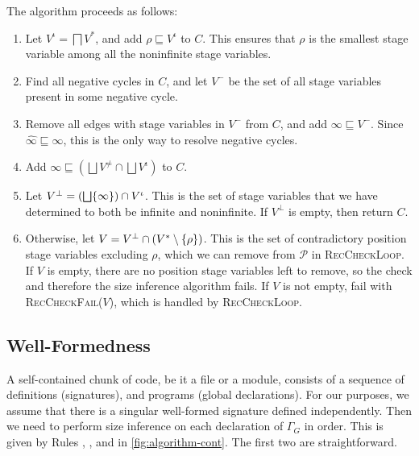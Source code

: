 \documentclass[acmsmall,screen,review,10pt]{acmart} %
\begin{document}
The algorithm proceeds as follows:

\begin{enumerate}
    \item Let $V^\iota = \bigsqcap V^*$, and add $\rho \sqsubseteq V^\iota$ to $C$. This ensures that $\rho$ is the smallest stage variable among all the noninfinite stage variables.
    \item Find all negative cycles in $C$, and let $V^-$ be the set of all stage variables present in some negative cycle.
    \item Remove all edges with stage variables in $V^-$ from $C$, and add $\infty \sqsubseteq V^-$. Since $\widehat{\infty} \sqsubseteq \infty$, this is the only way to resolve negative cycles.
    \item Add $\infty \sqsubseteq \left(\bigsqcup V^\neq \cap \bigsqcup V^\iota\right)$ to $C$.
    \item Let $V^\bot = \left(\bigsqcup \{\infty\}\right) \cap V^\iota$. This is the set of stage variables that we have determined to both be infinite and noninfinite. If $V^\bot$ is empty, then return $C$.
    \item Otherwise, let $V = V^\bot \cap (V^* \setminus \{\rho\})$. This is the set of contradictory position stage variables excluding $\rho$, which we can remove from $\mathcal{P}$ in \textsc{RecCheckLoop}. If $V$ is empty, there are no position stage variables left to remove, so the check and therefore the size inference algorithm fails. If $V$ is not empty, fail with \textsc{RecCheckFail}($V$), which is handled by \textsc{RecCheckLoop}.
\end{enumerate}



\subsection{Well-Formedness}

A self-contained chunk of code, be it a file or a module, consists of a sequence of \coinductive definitions (signatures), and programs (global declarations). For our purposes, we assume that there is a singular well-formed signature defined independently. Then we need to perform size inference on each declaration of $\Gamma_G$ in order. This is given by Rules , , and  in \autoref{fig:algorithm-cont}. The first two are straightforward.
\end{document}
